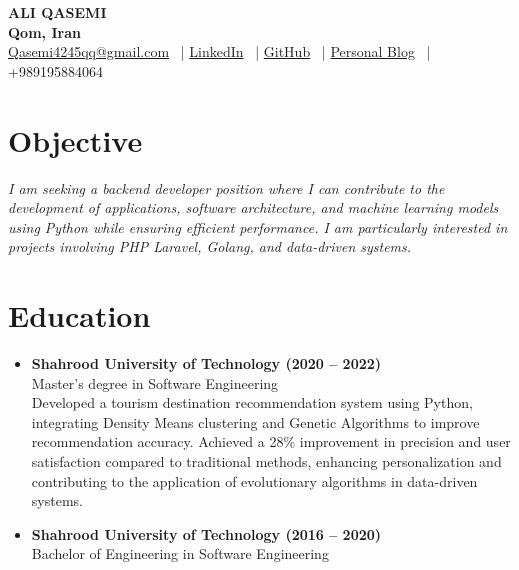 \documentclass[10pt, letterpaper]{article}
\newcommand{\icon}[1]{{\small #1}}
\begin{document}
\begin{center}
    \fontsize{30pt}{36pt}\textbf{ALI QASEMI} \\[0.2cm]
    \fontsize{12pt}{14pt}\color{secondaryColor}\textbf{Qom, Iran} \\[0.3cm]
    \href{mailto:Qasemi4245qq@gmail.com}{\icon{\faEnvelope[regular]} Qasemi4245qq@gmail.com} \ |
    \href{https://www.linkedin.com/in/aliqasemi/}{\icon{\faLinkedin} LinkedIn} \ |
    \href{https://github.com/aliqasemi}{\icon{\faGithub} GitHub} \ |
    \href{http://aliqasemi.github.io/}{\icon{\faLink} Personal Blog} \ |
    \icon{\faPhone} +989195884064
\end{center}

\section{Objective}
\textit{I am seeking a backend developer position where I can contribute to the development of applications, software architecture, and machine learning models using Python while ensuring efficient performance. I am particularly interested in projects involving PHP Laravel, Golang, and data-driven systems.}

\section{Education}
\begin{itemize}[leftmargin=*]
    \item \textbf{Shahrood University of Technology (2020 -- 2022)} \\
    Master's degree in Software Engineering \\
    Developed a tourism destination recommendation system using Python, integrating Density Means clustering and Genetic Algorithms to improve recommendation accuracy. Achieved a 28\% improvement in precision and user satisfaction compared to traditional methods, enhancing personalization and contributing to the application of evolutionary algorithms in data-driven systems.
    \item \textbf{Shahrood University of Technology (2016 -- 2020)} \\
    Bachelor of Engineering in Software Engineering
\end{itemize}

\end{document}
